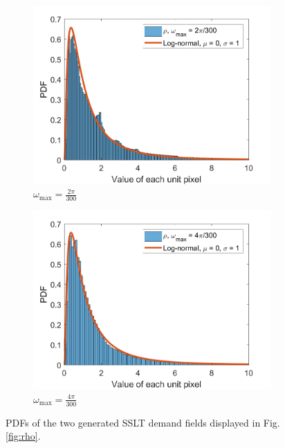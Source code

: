 \documentclass[12pt,dvipsnames]{report}
\begin{document}
\begin{figure}[!ht]
\centering
\begin{subfigure}{.45\textwidth}
	\centering
	\includegraphics[width=1\linewidth]{rho_pdf_O2pi-300_L50_X1000_Y1000}
	\caption{\small $\omega_{\max}=\frac{2\pi}{300}$}
	\label{fig:rho_pdf_2pi-300}
\end{subfigure}
\hspace{0.5cm}
\begin{subfigure}{.45\textwidth}
	\centering
	\includegraphics[width=1\linewidth]{rho_pdf_O4pi-300_L50_X1000_Y1000}
	\caption{\small $\omega_{\max}=\frac{4\pi}{300}$}
	\label{fig:rho_pdf_4pi-300}
\end{subfigure}
\caption[PDF comparisons of example SSLT demand fields to the log-normal distribution]{\small PDFs of the two generated SSLT demand fields displayed in Fig. \ref{fig:rho}.}
\label{fig:rho_pdf}
\end{figure}
\end{document}
